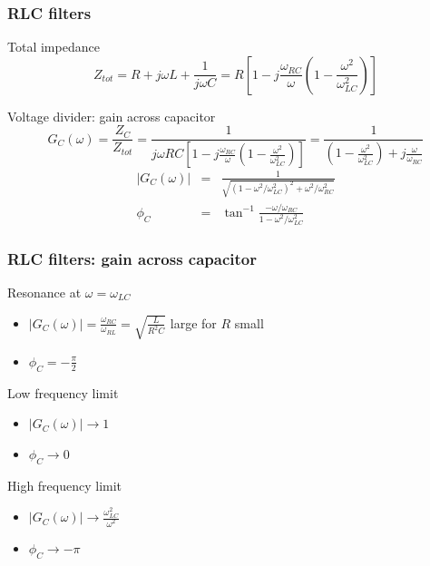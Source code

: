 \documentclass[beamer]{standalone}
\begin{document}
\begin{frame}
 \frametitle{RLC filters}
 \begin{block}{Total impedance}
  \begin{equation*}
   Z_{tot} = R + j\omega L + \frac{1}{j\omega C} = R \left[ 1 - j\frac{\omega_{RC}}{\omega} \left( 1 - \frac{\omega^2}{\omega_{LC}^2} \right) \right]
  \end{equation*}
 \end{block}
 \begin{block}{Voltage divider: gain across capacitor}
  \begin{equation*}
   G_C(\omega) = \frac{Z_C}{Z_{tot}} = \frac{1}{j\omega RC\left[ 1 - j\frac{\omega_{RC}}{\omega} \left( 1 - \frac{\omega^2}{\omega_{LC}^2} \right) \right]} = \frac{1}{\left( 1 - \frac{\omega^2}{\omega_{LC}^2} \right) + j\frac{\omega}{\omega_{RC}}}
  \end{equation*}
  \begin{eqnarray*}
   |G_C(\omega)| & = & \frac{1}{\sqrt{ \left(1 - \omega^2/\omega_{LC}^2 \right)^2 + \omega^2/\omega^2_{RC}}} \\
   \phi_C & = & \tan^{-1} \frac{- \omega/\omega_{RC}}{1 - \omega^2/\omega_{LC}^2}
  \end{eqnarray*}
 \end{block}
\end{frame}

\begin{frame}
 \frametitle{RLC filters: gain across capacitor}
 \begin{block}{Resonance at $\omega = \omega_{LC}$}
  \begin{itemize}
   \item $|G_C(\omega)| = \frac{\omega_{RC}}{\omega_{RL}} = \sqrt{\frac{L}{R^2 C}}$ large for $R$ small
   \item $\phi_C = -\frac{\pi}{2}$
  \end{itemize}
 \end{block}
 \begin{block}{Low frequency limit}
  \begin{itemize}
   \item $|G_C(\omega)| \to 1$
   \item $\phi_C \to 0$
  \end{itemize}
 \end{block}
 \begin{block}{High frequency limit}
  \begin{itemize}
   \item $|G_C(\omega)| \to \frac{\omega^2_{LC}}{\omega^2}$
   \item $\phi_C \to -\pi$
  \end{itemize}
 \end{block}
\end{frame}
\end{document}

